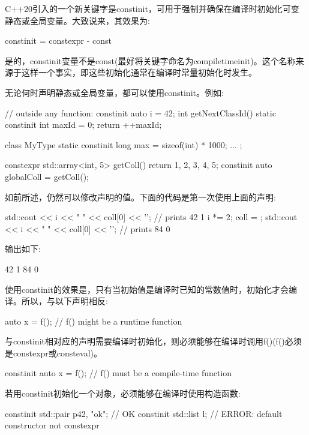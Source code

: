
C++20引入的一个新关键字是constinit，可用于强制并确保在编译时初始化可变静态或全局变量。大致说来，其效果为:

\begin{cpp}
constinit = constexpr - const
\end{cpp}

是的，constinit变量不是const(最好将关键字命名为compiletimeinit)。这个名称来源于这样一个事实，即这些初始化通常在编译时常量初始化时发生。

无论何时声明静态或全局变量，都可以使用constinit。例如:

\begin{cpp}
// outside any function:
constinit auto i = 42;
int getNextClassId() {
	static constinit int maxId = 0;
	return ++maxId;
}

class MyType {
	static constinit long max = sizeof(int) * 1000;
	...
};

constexpr std::array<int, 5> getColl() {
	return {1, 2, 3, 4, 5};
}
constinit auto globalColl = getColl();
\end{cpp}

如前所述，仍然可以修改声明的值。下面的代码是第一次使用上面的声明:

\begin{cpp}
std::cout << i << " " << coll[0] << '\n'; // prints 42 1
i *= 2;
coll = {};
std::cout << i << " " << coll[0] << '\n'; // prints 84 0
\end{cpp}

输出如下:

\begin{shell}
42 1
84 0
\end{shell}

使用constinit的效果是，只有当初始值是编译时已知的常数值时，初始化才会编译。所以，与以下声明相反:

\begin{cpp}
auto x = f(); // f() might be a runtime function
\end{cpp}

与constinit相对应的声明需要编译时初始化，则必须能够在编译时调用f()(f()必须是constexpr或consteval)。

\begin{cpp}
constinit auto x = f(); // f() must be a compile-time function
\end{cpp}

若用constinit初始化一个对象，必须能够在编译时使用构造函数:

\begin{cpp}
constinit std::pair p{42, "ok"}; // OK constinit std::list l; // ERROR: default constructor not constexpr
\end{cpp}

